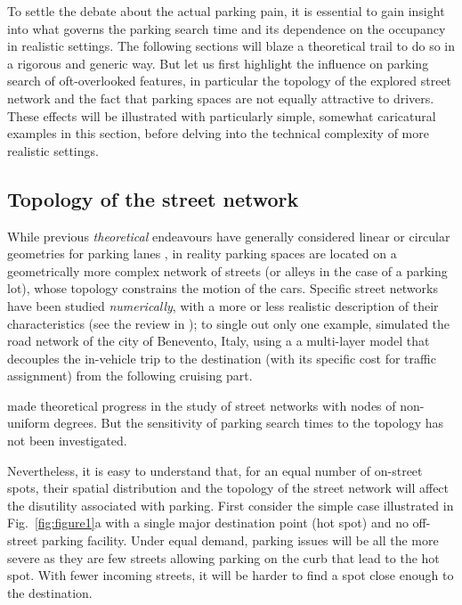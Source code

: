 \documentclass[trsc,reprint]{informs3}
\newcommand{\AN}[1]{#1}
\begin{document}
To settle the debate about the actual parking pain, it is essential to gain insight into what governs the parking search time
and its dependence on the occupancy in realistic settings. The following sections will blaze
a theoretical trail to do so in a rigorous and generic way. But let us first highlight the influence on parking search of oft-overlooked features, in particular the topology of the explored street network and the fact that parking spaces are not equally attractive to drivers.  These effects will be illustrated with particularly simple, somewhat caricatural examples in this section, before delving into the technical complexity of more realistic settings.



\subsection{Topology of the street network}

While previous \emph{theoretical} endeavours have \AN{generally} considered linear or circular geometries for parking lanes \citep{levy2013exploring,cao2015system,krapivsky2019simple,krapivsky2020should,arnott2017cruising},
in reality parking spaces are located on a geometrically more complex network of streets (or alleys in the case of a parking lot), whose topology constrains the motion of the 
cars. Specific street networks have been studied \emph{numerically}, with a more or less
realistic description of their characteristics (see the review in \citep{boujnah2017modelisation}); 
\AN{to single out only one example, \citet{gallo2011multilayer} 
simulated the road network of the city of Benevento, Italy, using a a multi-layer model that decouples the in-vehicle trip
to the destination (with its specific cost for traffic assignment) from the following cruising part.
}
\AN{ \citet{dowling2019modeling} made theoretical progress in the study of street networks with nodes of
non-uniform degrees.}
But the sensitivity of
\AN{parking search times} to the topology has not been investigated.

Nevertheless, it is easy to understand that, for an equal number of on-street spots, their 
\AN{spatial distribution and the topology of the street network} will
affect the disutility associated with parking. First consider the simple case
illustrated in Fig.~\ref{fig:figure1}a with a single major destination point (hot spot) and no off-street parking facility. Under equal demand, parking issues will be all the more severe as they are few streets allowing parking on the curb that lead to the hot spot. With fewer incoming streets, it will be harder to find a spot close enough to the destination.
\end{document}
